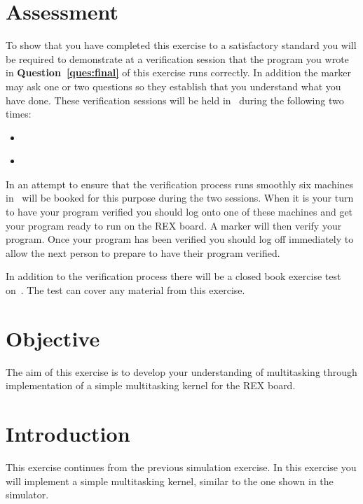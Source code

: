 \documentclass[a4paper,10pt]{article}
\begin{document}

\section{Assessment}

To show that you have completed this exercise to a satisfactory
standard you will be required to demonstrate at a verification session
that the program you wrote in \textbf{Question~\ref{ques:final}} of
this exercise runs correctly. In addition the marker may ask one or
two questions so they establish that you understand what you have
done.  These verification sessions will be held in \ASSESSROOM\ during the
following two times:

\begin{itemize}
\item \KERNDUE~\MORNINGASSESS
\item \KERNDUE~~\AFTERNOONASSESS
\end{itemize}

In an attempt to ensure that the verification process runs smoothly
six machines in \ASSESSROOM\ will be booked for this purpose during the two
sessions. When it is your turn to have your program verified you
should log onto one of these machines and get your program ready to
run on the REX board. A marker will then verify your program. Once
your program has been verified you should log off immediately to allow
the next person to prepare to have their program verified.

In addition to the verification process there will be a closed book
exercise test on~\textbf{\TESTTHREE}. The test can cover any material
from this exercise.

\section{Objective}

The aim of this exercise is to develop your understanding of
multitasking through implementation of a simple multitasking kernel
for the REX board.

\section{Introduction}

This exercise continues from the previous simulation exercise. In this
exercise you will implement a simple multitasking kernel, similar to
the one shown in the simulator.
\end{document}
